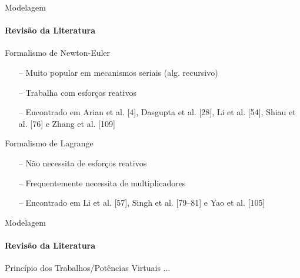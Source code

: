 \documentclass[25pt,landscape]{beamer}
\begin{document}
\begin{frame}{Modelagem}
    \framesubtitle{Revis\~ao da Literatura}
    \begin{block}{Formalismo de Newton-Euler}
        \begin{itemize}
            \item[--] Muito popular em mecanismos seriais (alg. recursivo) \\[4pt]
            \item[--] Trabalha com esfor\c{c}os reativos \\[4pt]
            \item[--] Encontrado em Arian et al. [4], Dasgupta et al. [28], Li et al. [54], Shiau et al. [76] e
Zhang et al. [109] \\[4pt]  
        \end{itemize}
    \end{block}
    \pause
    \begin{block}{Formalismo de Lagrange}
        \begin{itemize}
            \item[--] N\~ao necessita de esfor\c{c}os reativos \\[4pt]
            \item[--] Frequentemente necessita de multiplicadores \\[4pt]
            \item[--] Encontrado em Li et al. [57], Singh et al. [79--81] e Yao et al. [105] \\[4pt] 
        \end{itemize}
    \end{block}
\end{frame}

\begin{frame}{Modelagem}
    \framesubtitle{Revis\~ao da Literatura}
    \begin{block}{Princ\'ipio dos Trabalhos/Pot\^encias Virtuais}
        ...
    \end{block}
\end{frame}
\end{document}
